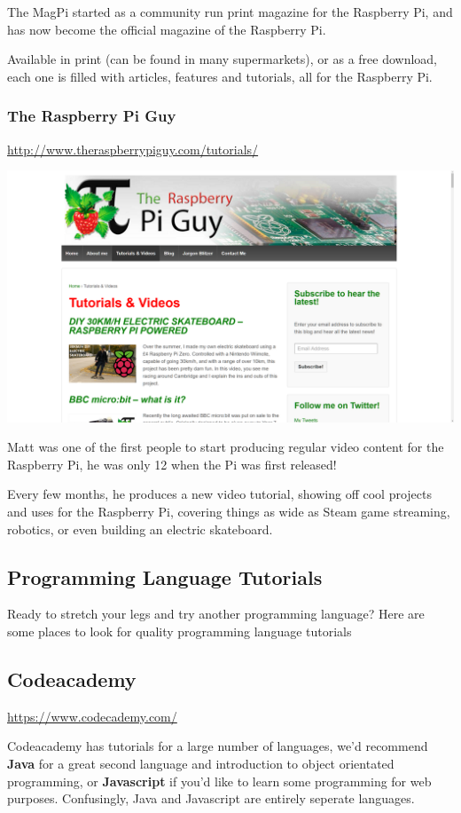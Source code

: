 			The MagPi started as a community run print magazine for the Raspberry Pi, and has now become the official magazine of the Raspberry Pi.
			
			Available in print (can be found in many supermarkets), or as a free download, each one is filled with articles, features and tutorials, all for the Raspberry Pi.
			
		\subsubsection*{The Raspberry Pi Guy}
			
			\url{http://www.theraspberrypiguy.com/tutorials/}
			\begin{center}
				\includegraphics[width=0.5\linewidth]{000_IntroToPi/4_Resources/piguy}
			\end{center}	
			
			Matt was one of the first people to start producing regular video content for the Raspberry Pi, he was only 12 when the Pi was first released!
			
			Every few months, he produces a new video tutorial, showing off cool projects and uses for the Raspberry Pi, covering things as wide as Steam game streaming, robotics, or even building an electric skateboard.
		
	\subsection{Programming Language Tutorials}
	
		Ready to stretch your legs and try another programming language? Here are some places to look for quality programming language tutorials
		
		\subsection*{Codeacademy}
		
		\url{https://www.codecademy.com/}
		
		Codeacademy has tutorials for a large number of languages, we'd recommend \textbf{Java} for a great second language and introduction to object orientated programming, or \textbf{Javascript} if you'd like to learn some programming for web purposes. Confusingly, Java and Javascript are entirely seperate languages.
		
